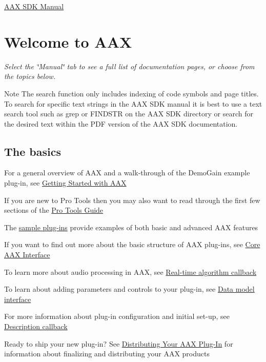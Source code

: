 \hyperlink{a00323}{A\+A\+X S\+D\+K Manual}\hypertarget{a00323_welcome}{}\section{Welcome to A\+A\+X}\label{a00323_welcome}
{\itshape Select the \char`\"{}\+Manual\char`\"{} tab to see a full list of documentation pages, or choose from the topics below.}

\begin{DoxyNote}{Note}
The search function only includes indexing of code symbols and page titles. To search for specific text strings in the A\+A\+X S\+D\+K manual it is best to use a text search tool such as grep or F\+I\+N\+D\+S\+T\+R on the A\+A\+X S\+D\+K directory or search for the desired text within the P\+D\+F version of the A\+A\+X S\+D\+K documentation.
\end{DoxyNote}
\hypertarget{a00323_welcome_basics}{}\subsection{The basics}\label{a00323_welcome_basics}
\begin{DoxyItemize}
\item For a general overview of A\+A\+X and a walk-\/through of the Demo\+Gain example plug-\/in, see \hyperlink{a00324}{Getting Started with A\+A\+X} \item If you are new to Pro Tools then you may also want to read through the first few sections of the \hyperlink{a00360}{Pro Tools Guide} \item The \hyperlink{a00376}{sample plug-\/ins} provide examples of both basic and advanced A\+A\+X features \item If you want to find out more about the basic structure of A\+A\+X plug-\/ins, see \hyperlink{a00325}{Core A\+A\+X Interface} \item To learn more about audio processing in A\+A\+X, see \hyperlink{a00327}{Real-\/time algorithm callback} \item To learn about adding parameters and controls to your plug-\/in, see \hyperlink{a00328}{Data model interface} \item For more information about plug-\/in configuration and initial set-\/up, see \hyperlink{a00326}{Description callback} \item Ready to ship your new plug-\/in? See \hyperlink{a00372}{Distributing Your A\+A\+X Plug-\/\+In} for information about finalizing and distributing your A\+A\+X products\end{DoxyItemize}
